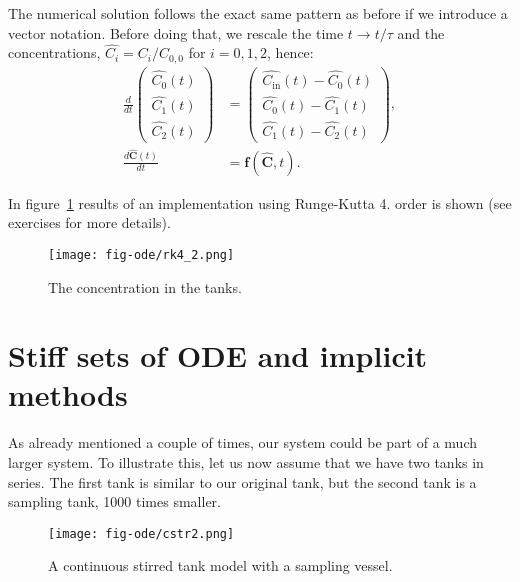 \documentclass[graybox,sectrefs,envcountresetchap,open=right,final]{svmonodo}
\begin{document}
The numerical solution follows the exact same pattern as before if we introduce a vector notation. Before doing that, we rescale the time $t\to t/\tau$ and the concentrations,
 $\hat{C_i}=C_i/C_{0,0}$ for $i=0,1,2$, hence:
\begin{align}
\frac{d}{dt}
\left(
\begin{array}{c} 
 \hat{C_0}(t)\\ 
 \hat{C_1}(t)\\ 
 \hat{C_2}(t)
 \end{array}
 \right)
&=\left(
\begin{array}{c} 
 \hat{C_\text{in}}(t) - \hat{C_0}(t)\\ 
 \hat{C_0}(t) - \hat{C_1}(t)\\ 
 \hat{C_1}(t) - \hat{C_2}(t)
 \end{array}
 \right),\nonumber
 \\ 
 \frac{d\mathbf{\hat{C}}(t)}{dt}&=\mathbf{f}(\mathbf{\hat{C}},t).
\end{align}

In figure~\ref{fig:ode:rk4_2} results of an implementation using Runge-Kutta 4. order is shown (see exercises for more details).

\begin{figure}[!ht]  %
  \centerline{\texttt{[image: fig-ode/rk4\_2.png]}}
  \caption{
  The concentration in the tanks. \label{fig:ode:rk4_2}
  }
\end{figure}


\section{Stiff sets of ODE  and implicit methods}
As already mentioned a couple of times, our system could be part of a much larger system. To illustrate this, let us now assume that we have two 
tanks in series. The first tank is similar to our original tank, but the second tank is a sampling tank, 1000 times smaller.   

\begin{figure}[!ht]  %
  \centerline{\texttt{[image: fig-ode/cstr2.png]}}
  \caption{
  A continuous stirred tank model with a sampling vessel. \label{fig:ode:cstr2}
  }
\end{figure}
\end{document}
